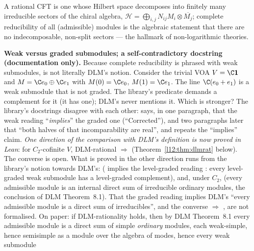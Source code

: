 \begin{physics}
A rational CFT is one whose Hilbert space decomposes into finitely many irreducible sectors of the chiral algebra,
$\mathcal H = \bigoplus_{i,j}N_{ij}M_i\otimes\overline{M_j}$; complete reducibility of all (admissible) modules is the
algebraic statement that there are no indecomposable, non-split sectors --- the hallmark of non-logarithmic theories.
\end{physics}

\begin{warning}
\textbf{Weak versus graded submodules; a self-contradictory docstring (documentation only).} Because complete reducibility is phrased
with weak submodules,  is not literally DLM's notion. Consider the trivial VOA $V = \C\ltwelvevac$
and $M = \C e_0\oplus\C e_1$ with $M(0) = \C e_0$, $M(1) = \C e_1$. The line $\C(e_0+e_1)$ is a weak submodule that is not
graded. The library's predicate demands a complement for it (it has one); DLM's never mentions it. Which is stronger? The
library's docstrings disagree with each other:  says, in one paragraph, that the
weak reading ``\emph{implies}'' the graded one (``Corrected''), and two paragraphs later that ``both halves of that
incomparability are real'', and  repeats the ``implies'' claim. \emph{One direction of
the comparison with DLM's definition is now proved in Lean}: for $C_2$-cofinite $V$, DLM-rational $\Rightarrow$
 (Theorem~\ref{l12:thm:dlmrat} below). The converse is open. What is proved in the other
direction runs from the library's notion towards DLM's:
 ( implies the level-graded reading
: every level-graded weak submodule has a level-graded complement), and, under $C_2$,
\allowbreak{}\allowbreak{}\allowbreak{}\allowbreak{}
(every admissible module is an internal direct sum of irreducible ordinary modules, the conclusion of DLM Theorem~8.1).
That the graded reading implies DLM's ``every admissible module is a direct sum of irreducibles'', and the converse
 $\Rightarrow$ , are not formalised. On paper: if DLM-rationality holds, then by DLM Theorem~8.1 every admissible module is a direct sum of simple
\emph{ordinary} modules, each weak-simple, hence semisimple as a module over the algebra of modes, hence every weak submodule

\end{warning}

